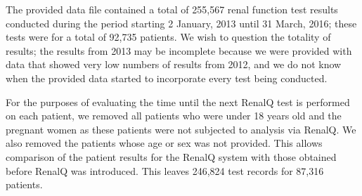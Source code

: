 
The provided data file contained  a total of 255,567  renal function test results conducted during the period starting 2 January, 2013 until 31 March, 2016; these tests were  for a total of 92,735 patients. We wish to question the totality of results;  the results from 2013 may be incomplete because we were provided with data that showed very low numbers of results from 2012, and we do not know when the provided data started to incorporate every test being conducted.


For the purposes of evaluating the time until the next RenalQ test is performed on each patient, we removed all patients who were under 18 years old and the pregnant women as these patients were not subjected to analysis via RenalQ. We also removed the patients whose age or sex was not provided. This allows comparison of the patient results for the RenalQ system with those obtained before RenalQ was introduced. 
This leaves 246,824  test records for 87,316   patients.
